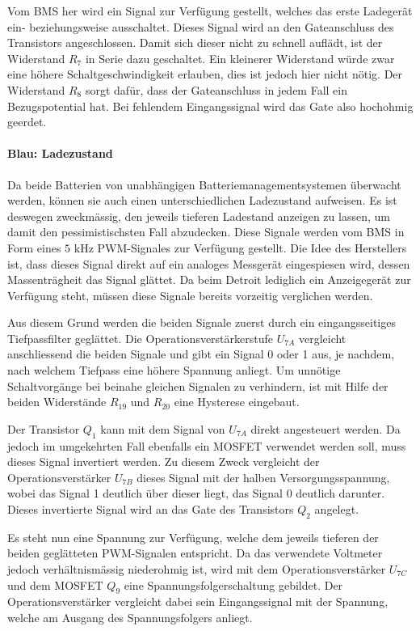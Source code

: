 Vom BMS her wird ein Signal zur Verfügung gestellt, welches das erste Ladegerät ein- beziehungsweise ausschaltet. Dieses Signal wird an den Gateanschluss des Transistors angeschlossen. Damit sich dieser nicht zu schnell auflädt, ist der Widerstand $R_7$ in Serie dazu geschaltet. Ein kleinerer Widerstand würde zwar eine höhere Schaltgeschwindigkeit erlauben, dies ist jedoch hier nicht nötig. Der Widerstand $R_8$ sorgt dafür, dass der Gateanschluss in jedem Fall ein Bezugspotential hat. Bei fehlendem Eingangssignal wird das Gate also hochohmig geerdet.

\paragraph{Blau: Ladezustand}
Da beide Batterien von unabhängigen Batteriemanagementsystemen überwacht werden, können sie auch einen unterschiedlichen Ladezustand aufweisen. Es ist deswegen zweckmässig, den jeweils tieferen Ladestand anzeigen zu lassen, um damit den pessimistischsten Fall abzudecken. Diese Signale werden vom BMS in Form eines $5$ kHz PWM-Signales zur Verfügung gestellt. Die Idee des Herstellers ist, dass dieses Signal direkt auf ein analoges Messgerät eingespiesen wird, dessen Massenträgheit das Signal glättet. Da beim Detroit lediglich ein Anzeigegerät zur Verfügung steht, müssen diese Signale bereits vorzeitig verglichen werden.

Aus diesem Grund werden die beiden Signale zuerst durch ein eingangsseitiges Tiefpassfilter geglättet. Die Operationsverstärkerstufe $U_{7A}$ vergleicht anschliessend die beiden Signale und gibt ein Signal 0 oder 1 aus, je nachdem, nach welchem Tiefpass eine höhere Spannung anliegt. Um unnötige Schaltvorgänge bei beinahe gleichen Signalen zu verhindern, ist mit Hilfe der beiden Widerstände $R_{19}$ und $R_{20}$ eine Hysterese eingebaut.

Der Transistor $Q_1$ kann mit dem Signal von $U_{7A}$ direkt angesteuert werden. Da jedoch im umgekehrten Fall ebenfalls ein MOSFET verwendet werden soll, muss dieses Signal invertiert werden. Zu diesem Zweck vergleicht der Operationsverstärker $U_{7B}$ dieses Signal mit der halben Versorgungsspannung, wobei das Signal 1 deutlich über dieser liegt, das Signal 0 deutlich darunter. Dieses invertierte Signal wird an das Gate des Transistors $Q_2$ angelegt.

Es steht nun eine Spannung zur Verfügung, welche dem jeweils tieferen der beiden geglätteten PWM-Signalen entspricht. Da das verwendete Voltmeter jedoch verhältnismässig niederohmig ist, wird mit dem Operationsverstärker $U_{7C}$ und dem MOSFET $Q_9$ eine Spannungsfolgerschaltung gebildet. Der Operationsverstärker vergleicht dabei sein Eingangssignal mit der Spannung, welche am Ausgang des Spannungsfolgers anliegt.

